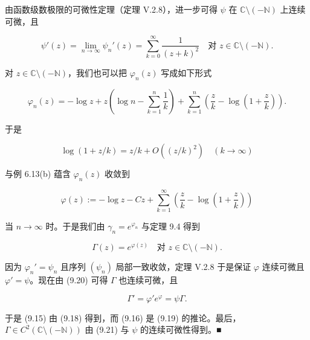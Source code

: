 \begin{proposition}
由函数级数极限的可微性定理（定理 V.2.8），进一步可得 $ \psi $ 在 $ \mathbb{C}\setminus(-\mathbb{N}) $ 上连续可微，且

\begin{equation}
\psi'(z) = \lim_{n \to \infty} \psi_n'(z) = \sum_{k=0}^{\infty} \frac{1}{(z+k)^{2}} \quad \text{对 } z \in \mathbb{C}\setminus(-\mathbb{N}) .\tag{9.19}
\end{equation}

对 $ z \in \mathbb{C}\setminus(-\mathbb{N}) $，我们也可以把 $ \varphi_n(z) $ 写成如下形式

\[
\varphi_n(z) = -\log z + z \left( \log n - \sum_{k=1}^{n} \frac{1}{k} \right) + \sum_{k=1}^{n} \left( \frac{z}{k} - \log\left( 1 + \frac{z}{k} \right) \right) .
\]

于是

\[
\log(1 + z/k) = z/k + O\left( (z/k)^{2} \right) \quad (k \to \infty)
\]

与例 6.13(b) 蕴含 $ \varphi_n(z) $ 收敛到

\[
\varphi(z) := -\log z - Cz + \sum_{k=1}^{\infty} \left( \frac{z}{k} - \log\left( 1 + \frac{z}{k} \right) \right)
\]

当 $ n \to \infty $ 时。于是我们由 $ \gamma_n = e^{\varphi_n} $ 与定理 9.4 得到

\begin{equation}
\Gamma(z) = e^{\varphi(z)} \quad \text{对 } z \in \mathbb{C}\setminus(-\mathbb{N}) .\tag{9.20}
\end{equation}

因为 $ \varphi_n' = \psi_n $ 且序列 $ (\psi_n) $ 局部一致收敛，定理 V.2.8 于是保证 $ \varphi $ 连续可微且 $ \varphi' = \psi $。现在由 (9.20) 可得 $ \Gamma $ 也连续可微，且

\begin{equation}
\Gamma' = \varphi' e^{\varphi} = \psi\Gamma .\tag{9.21}
\end{equation}

于是 (9.15) 由 (9.18) 得到，而 (9.16) 是 (9.19) 的推论。最后，$ \Gamma \in C^{2}(\mathbb{C}\setminus(-\mathbb{N})) $ 由 (9.21) 与 $ \psi $ 的连续可微性得到。\nobreak\hspace{0.35em}■

\end{proposition}

